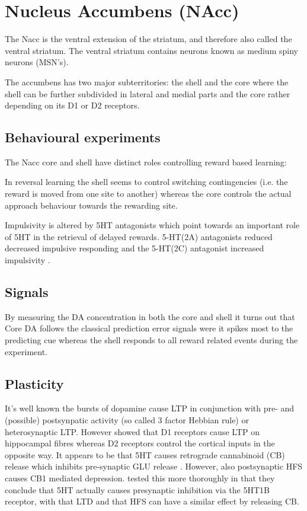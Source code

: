 \documentclass[12pt,a4paper]{article}
\begin{document}
\section{Nucleus Accumbens (NAcc)}

The Nacc is the ventral extension of the striatum, and therefore also called the ventral striatum.  The ventral striatum contains neurons known as medium spiny neurons (MSN's).

The accumbens has two major subterritories: the shell and the core 
\citep{heimer91} where the shell can be further subdivided \citep{Usuda1998} in lateral and medial parts and the core rather depending on its D1 or D2 receptors.

\subsection{Behavioural experiments}

The Nacc core and shell have distinct roles controlling reward based learning:

In reversal learning \citep{Dalton2014} the shell seems to control switching contingencies (i.e. the reward is moved from one site to another) whereas the core controls the actual approach behaviour towards the rewarding site.

Impulsivity is altered by 5HT antagonists which point towards an important role of 5HT in the retrieval of delayed rewards. 5-HT(2A) antagonists reduced decreased impulsive responding and the 5-HT(2C) antagonist increased impulsivity \citep{Robinson2008}.

\subsection{Signals}

By measuring the DA concentration in both the core and shell \citep{Saddoris2015} it turns out that Core DA follows the classical prediction error signals were it spikes most to the predicting cue whereas the shell responds to all reward related events during the experiment.

\subsection{Plasticity}

It's well known the bursts of dopamine cause LTP in conjunction with pre- and (possible) postsynpatic activity (so called 3 factor Hebbian rule) or heterosynaptic LTP. However \citep{Goto2005} showed that D1 receptors cause LTP on hippocampal fibres whereas D2 receptors control the cortical inputs in the opposite way.
It appears to be that 5HT causes retrograde cannabinoid (CB) release which inhibits pre-synaptic GLU release \citep{Burattini2014}. However, also postsynaptic HFS causes CB1 mediated depression. \citep{Mathur2011} tested this more thoroughly in that they conclude that 5HT actually causes presynaptic inhibition via the 5HT1B receptor, with that LTD and that HFS can have a similar effect by releasing CB.
\end{document}
